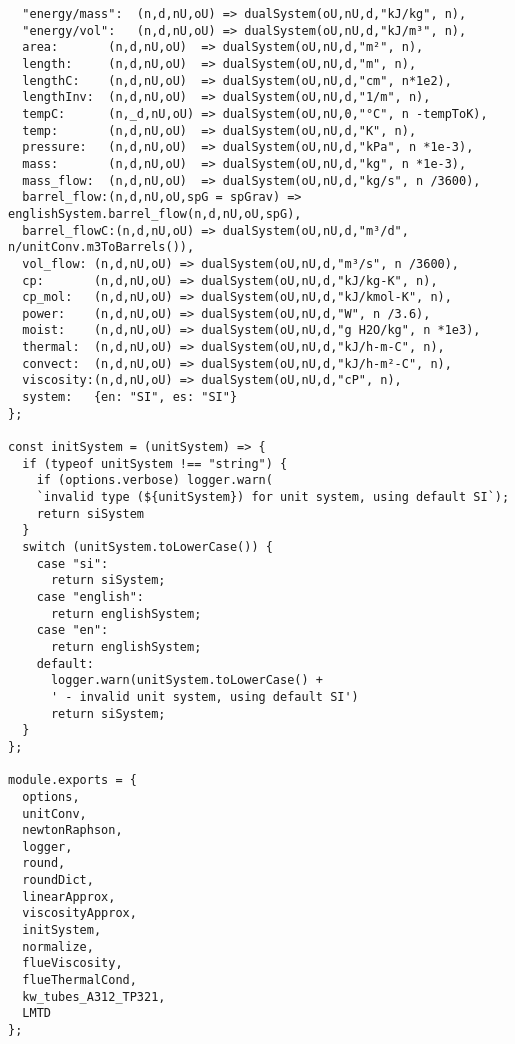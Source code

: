 \begin{verbatim}
  "energy/mass":  (n,d,nU,oU) => dualSystem(oU,nU,d,"kJ/kg", n),
  "energy/vol":   (n,d,nU,oU) => dualSystem(oU,nU,d,"kJ/m³", n),
  area:       (n,d,nU,oU)  => dualSystem(oU,nU,d,"m²", n),
  length:     (n,d,nU,oU)  => dualSystem(oU,nU,d,"m", n),
  lengthC:    (n,d,nU,oU)  => dualSystem(oU,nU,d,"cm", n*1e2),
  lengthInv:  (n,d,nU,oU)  => dualSystem(oU,nU,d,"1/m", n),
  tempC:      (n,_d,nU,oU) => dualSystem(oU,nU,0,"°C", n -tempToK),
  temp:       (n,d,nU,oU)  => dualSystem(oU,nU,d,"K", n),
  pressure:   (n,d,nU,oU)  => dualSystem(oU,nU,d,"kPa", n *1e-3),
  mass:       (n,d,nU,oU)  => dualSystem(oU,nU,d,"kg", n *1e-3),
  mass_flow:  (n,d,nU,oU)  => dualSystem(oU,nU,d,"kg/s", n /3600),
  barrel_flow:(n,d,nU,oU,spG = spGrav) => englishSystem.barrel_flow(n,d,nU,oU,spG),
  barrel_flowC:(n,d,nU,oU) => dualSystem(oU,nU,d,"m³/d", n/unitConv.m3ToBarrels()),
  vol_flow: (n,d,nU,oU) => dualSystem(oU,nU,d,"m³/s", n /3600),
  cp:       (n,d,nU,oU) => dualSystem(oU,nU,d,"kJ/kg-K", n),
  cp_mol:   (n,d,nU,oU) => dualSystem(oU,nU,d,"kJ/kmol-K", n),
  power:    (n,d,nU,oU) => dualSystem(oU,nU,d,"W", n /3.6),
  moist:    (n,d,nU,oU) => dualSystem(oU,nU,d,"g H2O/kg", n *1e3),
  thermal:  (n,d,nU,oU) => dualSystem(oU,nU,d,"kJ/h-m-C", n),
  convect:  (n,d,nU,oU) => dualSystem(oU,nU,d,"kJ/h-m²-C", n),
  viscosity:(n,d,nU,oU) => dualSystem(oU,nU,d,"cP", n),
  system:   {en: "SI", es: "SI"}
};

const initSystem = (unitSystem) => {
  if (typeof unitSystem !== "string") {
    if (options.verbose) logger.warn( 
    `invalid type (${unitSystem}) for unit system, using default SI`);
    return siSystem
  }
  switch (unitSystem.toLowerCase()) {
    case "si":
      return siSystem;
    case "english":
      return englishSystem;
    case "en":
      return englishSystem;
    default:
      logger.warn(unitSystem.toLowerCase() + 
      ' - invalid unit system, using default SI')
      return siSystem;
  }
};

module.exports = {
  options,
  unitConv,
  newtonRaphson,
  logger,
  round,
  roundDict,
  linearApprox,
  viscosityApprox,
  initSystem,
  normalize,
  flueViscosity,
  flueThermalCond,
  kw_tubes_A312_TP321,
  LMTD
};
\end{verbatim}
